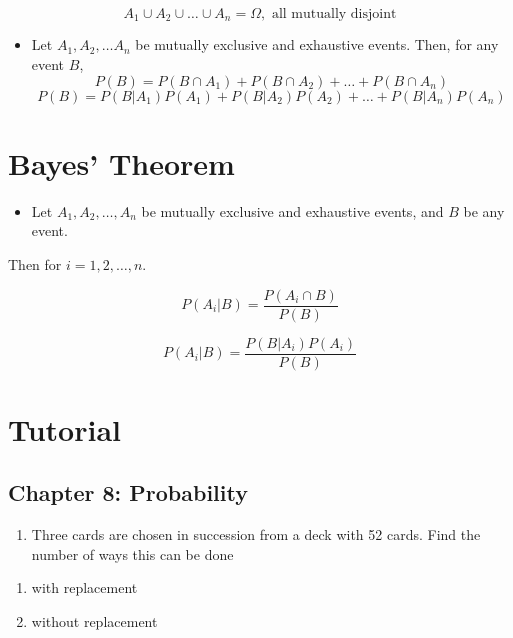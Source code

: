 \documentclass[]{book}
\providecommand{\tightlist}{%
  \setlength{\itemsep}{0pt}\setlength{\parskip}{0pt}}
\begin{document}
\[A_1\cup A_2\cup \dots \cup A_n = \Omega, \text{ all mutually disjoint}\]

\begin{itemize}
\tightlist
\item
  Let \(A_1, A_2, \dots A_n\) be mutually exclusive and exhaustive events. Then, for any event \(B\),
  \[P(B) = P(B \cap A_1) + P(B \cap A_2) + \dots + P(B \cap A_n)\]
  \[P(B) = P(B|A_1) P(A_1) + P(B|A_2) P(A_2) +\dots+ P(B|A_n) P(A_n)\]
\end{itemize}

\hypertarget{bayes-theorem}{%
\section{Bayes' Theorem}\label{bayes-theorem}}

\begin{itemize}
\tightlist
\item
  Let \(A_1, A_2, \dots,A_n\) be mutually exclusive and exhaustive events, and \(B\) be any event.
\end{itemize}

Then for \(i = 1, 2, \dots, n\).

\[P(A_i|B) = \frac{P(A_i \cap B)}{P(B)}\]

\[P(A_i|B) = \frac{P(B|A_i)P(A_i)}{P(B)}\]

\newpage

\hypertarget{tutorial-4}{%
\section{Tutorial}\label{tutorial-4}}

\hypertarget{chapter-8-probability}{%
\subsection*{Chapter 8: Probability}\label{chapter-8-probability}}

\begin{enumerate}
\def\labelenumi{\arabic{enumi}.}
\tightlist
\item
  Three cards are chosen in succession from a deck with 52 cards. Find the number of ways this can be done
\end{enumerate}

\begin{enumerate}
\def\labelenumi{(\alph{enumi})}
\tightlist
\item
  with replacement
\item
  without replacement
\end{enumerate}
\end{document}
